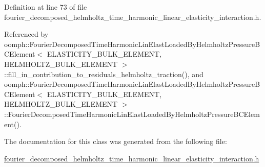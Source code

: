 Definition at line 73 of file fourier\+\_\+decomposed\+\_\+helmholtz\+\_\+time\+\_\+harmonic\+\_\+linear\+\_\+elasticity\+\_\+interaction.\+h.



Referenced by oomph\+::\+Fourier\+Decomposed\+Time\+Harmonic\+Lin\+Elast\+Loaded\+By\+Helmholtz\+Pressure\+B\+C\+Element$<$ E\+L\+A\+S\+T\+I\+C\+I\+T\+Y\+\_\+\+B\+U\+L\+K\+\_\+\+E\+L\+E\+M\+E\+N\+T, H\+E\+L\+M\+H\+O\+L\+T\+Z\+\_\+\+B\+U\+L\+K\+\_\+\+E\+L\+E\+M\+E\+N\+T $>$\+::fill\+\_\+in\+\_\+contribution\+\_\+to\+\_\+residuals\+\_\+helmholtz\+\_\+traction(), and oomph\+::\+Fourier\+Decomposed\+Time\+Harmonic\+Lin\+Elast\+Loaded\+By\+Helmholtz\+Pressure\+B\+C\+Element$<$ E\+L\+A\+S\+T\+I\+C\+I\+T\+Y\+\_\+\+B\+U\+L\+K\+\_\+\+E\+L\+E\+M\+E\+N\+T, H\+E\+L\+M\+H\+O\+L\+T\+Z\+\_\+\+B\+U\+L\+K\+\_\+\+E\+L\+E\+M\+E\+N\+T $>$\+::\+Fourier\+Decomposed\+Time\+Harmonic\+Lin\+Elast\+Loaded\+By\+Helmholtz\+Pressure\+B\+C\+Element().



The documentation for this class was generated from the following file\+:\begin{DoxyCompactItemize}
\item 
\hyperlink{fourier__decomposed__helmholtz__time__harmonic__linear__elasticity__interaction_8h}{fourier\+\_\+decomposed\+\_\+helmholtz\+\_\+time\+\_\+harmonic\+\_\+linear\+\_\+elasticity\+\_\+interaction.\+h}\end{DoxyCompactItemize}
